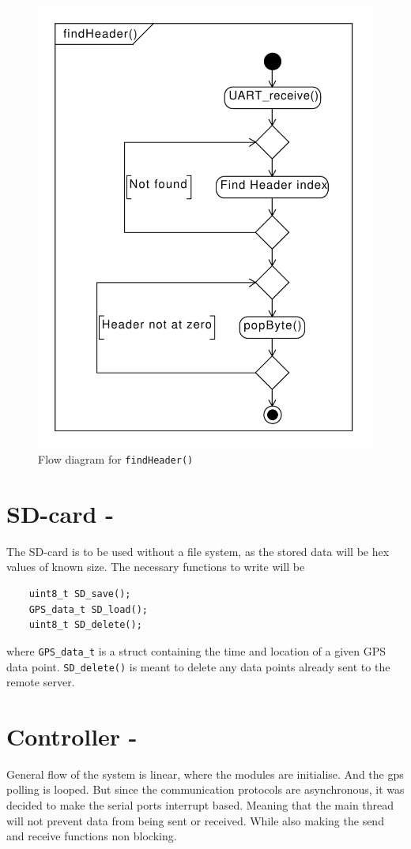 \begin{figure}
	\centering
	\includegraphics[width=0.7\linewidth]{gfx/Design/GPSFlowFindHeader.pdf}
	\caption{Flow diagram for \texttt{findHeader()}}
	\label{fig:gpsflowfindheader}
\end{figure}


\section{SD-card - \SDsock}
The SD-card is to be used without a file system, as the stored data will be hex values of known size.
The necessary functions to write will be
\begin{verbatim}
	uint8_t SD_save();
	GPS_data_t SD_load();
	uint8_t SD_delete();
\end{verbatim}
where \texttt{GPS_data_t} is a struct containing the time and location of a given GPS data point.
\texttt{SD_delete()} is meant to delete any data points already sent to the remote server.

\section{Controller - \SAMD}
General flow of the system is linear, where the modules are initialise. And the gps polling is looped. 
But since the communication protocols are asynchronous, it was decided to make the serial ports interrupt based. Meaning that the main thread will not prevent data from being sent or received. While also making the send and receive functions non blocking.

